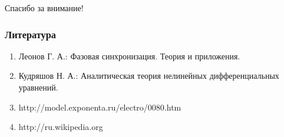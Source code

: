 \documentclass[hyperref={pdftex,unicode}]{beamer}
\begin{document}
\begin{frame}
\begin{center}

Спасибо за внимание!

\end{center}
\end{frame}


\begin{frame}
\frametitle{Литература}

\begin{enumerate}
\item{Леонов Г. А.: Фазовая синхронизация. Теория и приложения.}
\item{Кудряшов Н. А.: Аналитическая теория нелинейных дифференциальных уравнений.}

\item{http://model.exponenta.ru/electro/0080.htm}
\item{http://ru.wikipedia.org}

\end{enumerate}

\end{frame}
\end{document}
